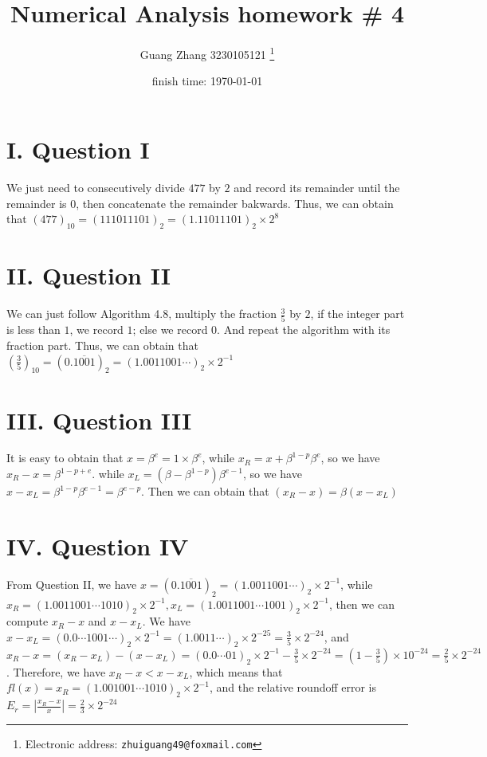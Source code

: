 \documentclass[a4paper]{article}
\begin{document}
\title{Numerical Analysis homework \# 4}

\author{Guang Zhang 3230105121
  \thanks{Electronic address: \texttt{zhuiguang49@foxmail.com}}}

\date{finish time: \today}

\maketitle






\section*{I. Question I}

We just need to consecutively divide $477$ by $2$ and record its remainder until the remainder is $0$, then concatenate
the remainder bakwards. Thus, we can obtain that $(477)_{10}=(111011101)_2=(1.11011101)_2\times 2^8$

\section*{II. Question II}

We can just follow Algorithm 4.8, multiply the fraction $\frac{3}{5}$ by $2$, if the integer part is less than $1$, we record $1$; else we record $0$. And repeat the algorithm with its fraction part.
Thus, we can obtain that $(\frac{3}{5})_{10}=(0.\overline{1001})_{2}=(1.0011001\cdots)_2\times 2^{-1}$


\section*{III. Question III}

It is easy to obtain that $x=\beta^e=1\times \beta^e$, while $x_R=x+\beta^{1-p} \beta^e$, so we have $x_R-x=\beta^{1-p+e}$. while
$x_L=(\beta-\beta^{1-p})\beta^{e-1}$, so we have $x-x_L=\beta^{1-p} \beta^{e-1}=\beta^{e-p}$. Then we can obtain that $(x_R-x)=\beta(x-x_L)$


\section*{IV. Question IV}

From Question II, we have $x=(0.\overline{1001})_2=(1.0011001\cdots)_2\times2^{-1}$, while $x_{R}=(1.0011001\cdots 1010)_2\times 2^{-1},x_L=(1.0011001\cdots1001)_2\times 2^{-1}$, then we can compute $x_R-x$ and $x-x_L$.\newline
We have $x-x_L=(0.0\cdots1001\cdots)_2\times 2^{-1}=(1.0011\cdots)_2\times 2^{-25}=\frac{3}{5}\times 2^{-24}$, and $x_R-x=(x_R-x_L)-(x-x_L)=(0.0\cdots01)_2\times 2^{-1}-\frac{3}{5}\times 2^{-24}=(1-\frac{3}{5})\times 10^{-24}=\frac{2}{5}\times 2^{-24}$.\newline
Therefore, we have $x_R-x<x-x_L$, which means that $fl(x)=x_R=(1.001001\cdots1010)_2\times 2^{-1}$, and the relative roundoff error is $E_r=|\frac{x_R-x}{x}|=\frac{2}{3}\times 2^{-24}$
\end{document}
